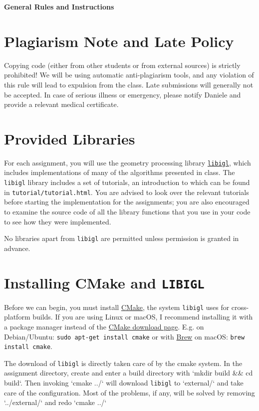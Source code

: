 \documentclass[11pt]{amsart}
\begin{document}
\hspace{50pt}

\begin{center}

{\Huge \textbf{General Rules and Instructions}}\\
\end{center}

\section*{Plagiarism Note and Late Policy}
Copying code (either from other students or from external sources) is strictly
prohibited! We will be using automatic anti-plagiarism tools, and any violation
of this rule will lead to expulsion from the class. Late submissions will
generally not be accepted. In case of serious illness or emergency, please notify
Daniele and provide a relevant medical certificate.

\section*{Provided Libraries}
For each assignment, you will use the geometry processing library
\href{https://github.com/libigl/libigl/}{\texttt{libigl}}, which
includes implementations of many of the algorithms presented in class.
The \texttt{libigl} library
includes a set of tutorials, an introduction to which can be found in
\texttt{tutorial/tutorial.html}. You are advised to look over the relevant
tutorials before starting the implementation for the
assignments; you are also encouraged to examine the source code of all
the library functions that you use in your code to see how they were
implemented.

No libraries apart from \texttt{libigl} are permitted unless permission is
granted in advance.

\section*{Installing CMake and \texttt{LIBIGL}}
Before we can begin, you must install \href{https://cmake.org/}{CMake}, the
system \texttt{libigl} uses for cross-platform builds. If you are using Linux or
macOS, I recommend installing it with a package manager instead of the
\href{https://cmake.org/download/}{CMake download page}.
E.g. on Debian/Ubuntu: \texttt{sudo apt-get install cmake} or with
\href{https://brew.sh}{Brew} on macOS: \texttt{brew install cmake}.

The download of \texttt{libigl} is directly taken care of by the cmake system.
In the assignment directory, create and enter a build directory with `mkdir build \&\& cd build`.
Then invoking `cmake ../` will download \texttt{libigl} to `external/` and take care of the configuration.
Most of the problems, if any, will be solved by removing `../external/` and redo `cmake ../` 
\end{document}
